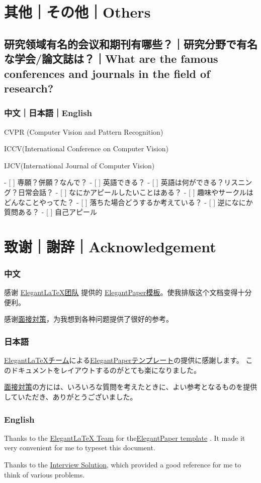 \documentclass[lang=cn,11pt,a4paper]{elegantpaper}
\begin{document}
\section{其他｜その他｜Others}
\subsection{研究领域有名的会议和期刊有哪些？｜研究分野で有名な学会/論文誌は？｜What are the famous conferences and journals in the field of research?}
\subsubsection{中文｜日本語｜English}
CVPR (Computer Vision and Pattern Recognition)

ICCV(International Conference on Computer Vision)

IJCV(International Journal of Computer Vision)

- [ ]  専願？併願？なんで？
- [ ]  英語できる？
- [ ]  英語は何ができる？リスニング？日常会話？
- [ ]  なにかアピールしたいことはある？
- [ ]  趣味やサークルはどんなことやってた？
- [ ]  落ちた場合どうするか考えている？
- [ ]  逆になにか質問ある？
- [ ]  自己アピール
\section{致谢｜謝辞｜Acknowledgement}
\subsubsection{中文}
感谢  \href{https://elegantlatex.org/}{ElegantLaTeX团队} 提供的 \href{https://github.com/ElegantLaTeX/ElegantPaper}{ElegantPaper模板}。使我排版这个文档变得十分便利。

感谢\href{https://hatodove22.notion.site/16f0eba93f3c4153bd1f770892aaf6b1}{面接対策}，为我想到各种问题提供了很好的参考。
\subsubsection{日本語}
\href{https://elegantlatex.org/}{ElegantLaTeXチーム}による\href{https://github.com/ElegantLaTeX/ElegantPaper}{ElegantPaperテンプレート}の提供に感謝します。 このドキュメントをレイアウトするのがとても楽になりました。

\href{https://hatodove22.notion.site/16f0eba93f3c4153bd1f770892aaf6b1}{面接対策}の方には、いろいろな質問を考えたときに、よい参考となるものを提供していただき、ありがとうございました。
\subsubsection{English}
Thanks to the \href{https://elegantlatex.org/}{ElegantLaTeX Team}  for the\href{https://github.com/ElegantLaTeX/ElegantPaper}{ElegantPaper template} . It made it very convenient for me to typeset this document.

Thanks to the \href{https://hatodove22.notion.site/16f0eba93f3c4153bd1f770892aaf6b1}{Interview Solution}, which provided a good reference for me to think of various problems.


\nocite{*}

\end{document}
